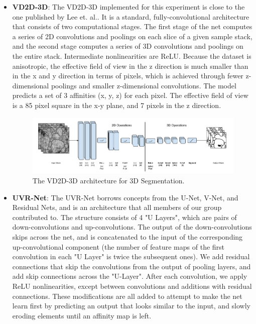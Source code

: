 \begin{itemize}
	\item \textbf{VD2D-3D}: The VD2D-3D implemented for this experiment is close to the one published by Lee et. al.\cite{Lee}. It is a standard, fully-convolutional architecture that consists of two computational stages. The first stage of the net computes a series of 2D convolutions and poolings on each slice of a given sample stack, and the second stage computes a series of 3D convolutions and poolings on the entire stack. Intermediate nonlinearities are ReLU. Because the dataset is anisotropic, the effective field of view in the z direction is much smaller than in the x and y direction in terms of pixels, which is achieved through fewer z-dimensional poolings and smaller z-dimensional convolutions. The model predicts a set of 3 affinities (x, y, z) for each pixel. The effective field of view is a 85 pixel square in the x-y plane, and 7 pixels in the z direction.

	\begin{figure}
	\centering
	\includegraphics[width=\textwidth]{img/VD2D_3D.png}
	\caption{The VD2D-3D architecture for 3D Segmentation.}
	\label{fig:vd2d_3d}
	\end{figure}

	\item \textbf{UVR-Net}: The UVR-Net borrows concepts from the U-Net, V-Net, and Residual Nets, and is an architecture that all members of our group contributed to\cite{Ronneberger2015,He2015,Milletari2016,Cicek2016}. The structure consists of 4 "U Layers", which are pairs of down-convolutions and up-convolutions. The output of the down-convolutions skips across the net, and is concatenated to the input of the corresponding up-convolutional component (the number of feature maps of the first convolution in each "U Layer" is twice the subsequent ones). We add residual connections that skip the convolutions from the output of pooling layers, and add skip connections across the "U-Layer". After each convolution, we apply ReLU nonlinearities, except between convolutions and additions with residual connections. These modifications are all added to attempt to make the net learn first by predicting an output that looks similar to the input, and slowly eroding elements until an affinity map is left.


\end{itemize}
